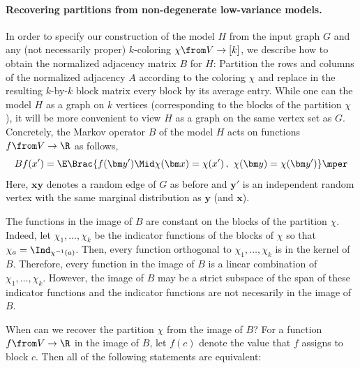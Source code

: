 \paragraph{Recovering partitions from non-degenerate low-variance models.}
In order to specify our construction of the model \(H\) from the input graph \(G\) and any (not necessarily proper) \(k\)-coloring \(\chi\from V\to [k]\), we describe how to obtain the normalized adjacency matrix \(B\) for \(H\):
Partition the rows and columns of the normalized adjacency \(A\) according to the coloring \(\chi\) and replace in the resulting \(k\)-by-\(k\) block matrix every block by its average entry.
While one can the model \(H\) as a graph on \(k\) vertices (corresponding to the blocks of the partition \(\chi\)), it will be more convenient to view \(H\) as a graph on the same vertex set as \(G\).
Concretely, the Markov operator \(B\) of the model \(H\) acts on functions \(f\from V\to \R\) as follows,
\begin{equation}
  Bf(x') = \E \Brac{f(\bm y') \Mid \chi(\bm x)=\chi(x')\,,~\chi(\bm y) = \chi(\bm y') }
  \mper
\end{equation}
Here, \(\bm x \bm y\) denotes a random edge of \(G\) as before and \(\bm y'\) is an independent random vertex with the same marginal distribution as \(\bm y\) (and \(\bm x\)).

The functions in the image of \(B\) are constant on the blocks of the partition \(\chi\).
Indeed, let \(\chi_{1},\ldots,\chi_{k}\) be the indicator functions of the blocks of \(\chi\) so that \(\chi_{a}=\Ind_{\chi^{-1}(a)}\).
Then, every function orthogonal to \(\chi_{1},\ldots,\chi_{k}\) is in the kernel of \(B\).
Therefore, every function in the image of \(B\) is a linear combination of \(\chi_{1},\ldots,\chi_{k}\).
However, the image of \(B\) may be a strict subspace of the span of these indicator functions and the indicator functions are not necesarily in the image of \(B\).

When can we recover the partition \(\chi\) from the image of \(B\)?
For a function \(f\from V\to \R\) in the image of \(B\), let \(f(c)\) denote the value that \(f\) assigns to block \(c\).
Then all of the following statements are equivalent:

